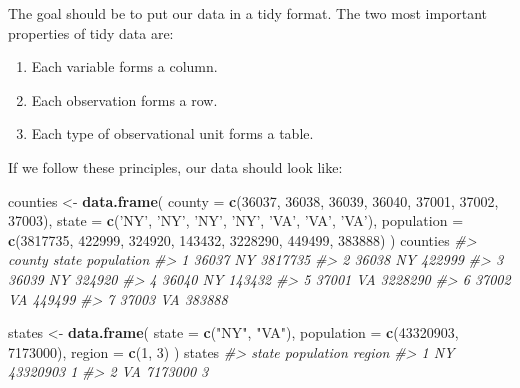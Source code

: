 \documentclass[]{book}
\newenvironment{Shaded}{\begin{snugshade}}{\end{snugshade}}
\newcommand{\KeywordTok}[1]{\textcolor[rgb]{0.13,0.29,0.53}{\textbf{#1}}}
\newcommand{\DataTypeTok}[1]{\textcolor[rgb]{0.13,0.29,0.53}{#1}}
\newcommand{\DecValTok}[1]{\textcolor[rgb]{0.00,0.00,0.81}{#1}}
\newcommand{\StringTok}[1]{\textcolor[rgb]{0.31,0.60,0.02}{#1}}
\newcommand{\CommentTok}[1]{\textcolor[rgb]{0.56,0.35,0.01}{\textit{#1}}}
\newcommand{\NormalTok}[1]{#1}
\providecommand{\tightlist}{%
  \setlength{\itemsep}{0pt}\setlength{\parskip}{0pt}}
\begin{document}
The goal should be to put our data in a tidy format. The two most
important properties of tidy data are:

\begin{enumerate}
\def\labelenumi{\arabic{enumi}.}
\tightlist
\item
  Each variable forms a column.
\item
  Each observation forms a row.
\item
  Each type of observational unit forms a table.
\end{enumerate}

If we follow these principles, our data should look like:

\begin{Shaded}
\begin{Highlighting}[]
\NormalTok{counties <-}\StringTok{ }\KeywordTok{data.frame}\NormalTok{(}
  \DataTypeTok{county =} \KeywordTok{c}\NormalTok{(}\DecValTok{36037}\NormalTok{, }\DecValTok{36038}\NormalTok{, }\DecValTok{36039}\NormalTok{, }\DecValTok{36040}\NormalTok{, }\DecValTok{37001}\NormalTok{, }\DecValTok{37002}\NormalTok{, }\DecValTok{37003}\NormalTok{),}
  \DataTypeTok{state =} \KeywordTok{c}\NormalTok{(}\StringTok{'NY'}\NormalTok{, }\StringTok{'NY'}\NormalTok{, }\StringTok{'NY'}\NormalTok{, }\StringTok{'NY'}\NormalTok{, }\StringTok{'VA'}\NormalTok{, }\StringTok{'VA'}\NormalTok{, }\StringTok{'VA'}\NormalTok{),}
  \DataTypeTok{population =} \KeywordTok{c}\NormalTok{(}\DecValTok{3817735}\NormalTok{, }\DecValTok{422999}\NormalTok{, }\DecValTok{324920}\NormalTok{, }\DecValTok{143432}\NormalTok{, }\DecValTok{3228290}\NormalTok{, }\DecValTok{449499}\NormalTok{, }\DecValTok{383888}\NormalTok{)}
\NormalTok{)}
\NormalTok{counties}
\CommentTok{#>   county state population}
\CommentTok{#> 1  36037    NY    3817735}
\CommentTok{#> 2  36038    NY     422999}
\CommentTok{#> 3  36039    NY     324920}
\CommentTok{#> 4  36040    NY     143432}
\CommentTok{#> 5  37001    VA    3228290}
\CommentTok{#> 6  37002    VA     449499}
\CommentTok{#> 7  37003    VA     383888}

\NormalTok{states <-}\StringTok{ }\KeywordTok{data.frame}\NormalTok{(}
  \DataTypeTok{state =} \KeywordTok{c}\NormalTok{(}\StringTok{"NY"}\NormalTok{, }\StringTok{"VA"}\NormalTok{),}
  \DataTypeTok{population =} \KeywordTok{c}\NormalTok{(}\DecValTok{43320903}\NormalTok{, }\DecValTok{7173000}\NormalTok{),}
  \DataTypeTok{region =} \KeywordTok{c}\NormalTok{(}\DecValTok{1}\NormalTok{, }\DecValTok{3}\NormalTok{)}
\NormalTok{)}
\NormalTok{states}
\CommentTok{#>   state population region}
\CommentTok{#> 1    NY   43320903      1}
\CommentTok{#> 2    VA    7173000      3}
\end{Highlighting}
\end{Shaded}
\end{document}
